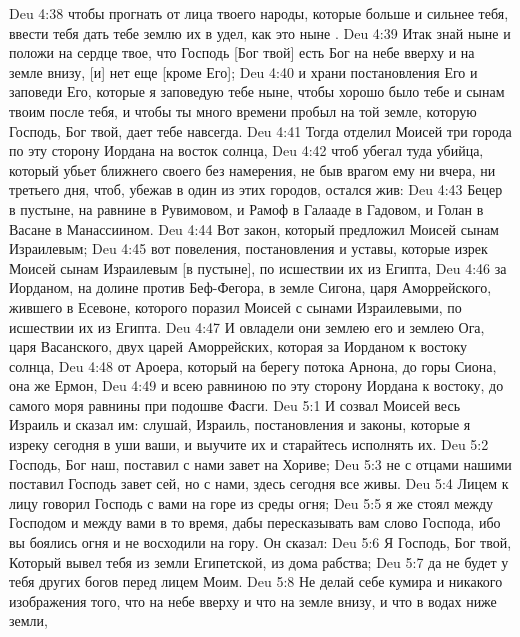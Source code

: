 \vs Deu 4:38 чтобы прогнать от лица твоего народы, которые больше и сильнее тебя,  ввести тебя  дать тебе землю их в удел, как это ныне .
\vs Deu 4:39 Итак знай ныне и положи на сердце твое, что Господь [Бог твой] есть Бог на небе вверху и на земле внизу, [и] нет еще [кроме Его];
\vs Deu 4:40 и храни постановления Его и заповеди Его, которые я заповедую тебе ныне, чтобы хорошо было тебе и сынам твоим после тебя, и чтобы ты много времени пробыл на той земле, которую Господь, Бог твой, дает тебе навсегда.
\rsbpar\vs Deu 4:41 Тогда отделил Моисей три города по эту сторону Иордана на восток солнца,
\vs Deu 4:42 чтоб убегал туда убийца, который убьет ближнего своего без намерения, не быв врагом ему ни вчера, ни третьего дня,  чтоб, убежав в один из этих городов, остался жив:
\vs Deu 4:43 Бецер в пустыне, на равнине в  Рувимовом, и Рамоф в Галааде в  Гадовом, и Голан в Васане в  Манассиином.
\rsbpar\vs Deu 4:44 Вот закон, который предложил Моисей сынам Израилевым;
\vs Deu 4:45 вот повеления, постановления и уставы, которые изрек Моисей сынам Израилевым [в пустыне], по исшествии их из Египта,
\vs Deu 4:46 за Иорданом, на долине против Беф-Фегора, в земле Сигона, царя Аморрейского, жившего в Есевоне, которого поразил Моисей с сынами Израилевыми, по исшествии их из Египта.
\vs Deu 4:47 И овладели они землею его и землею Ога, царя Васанского, двух царей Аморрейских, которая за Иорданом к востоку солнца,
\vs Deu 4:48  от Ароера, который  на берегу потока Арнона, до горы Сиона, она же Ермон,
\vs Deu 4:49 и всею равниною по эту сторону Иордана к востоку, до самого моря равнины при подошве Фасги.
\vs Deu 5:1 И созвал Моисей весь Израиль и сказал им: слушай, Израиль, постановления и законы, которые я изреку сегодня в уши ваши, и выучите их и старайтесь исполнять их.
\vs Deu 5:2 Господь, Бог наш, поставил с нами завет на Хориве;
\vs Deu 5:3 не с отцами нашими поставил Господь завет сей, но с нами,  здесь сегодня все живы.
\vs Deu 5:4 Лицем к лицу говорил Господь с вами на горе из среды огня;
\vs Deu 5:5 я же стоял между Господом и между вами в то время, дабы пересказывать вам слово Господа, ибо вы боялись огня и не восходили на гору. Он  сказал:
\rsbpar\vs Deu 5:6 Я Господь, Бог твой, Который вывел тебя из земли Египетской, из дома рабства;
\vs Deu 5:7 да не будет у тебя других богов перед лицем Моим.
\rsbpar\vs Deu 5:8 Не делай себе кумира и никакого изображения того, что на небе вверху и что на земле внизу, и что в водах ниже земли,
